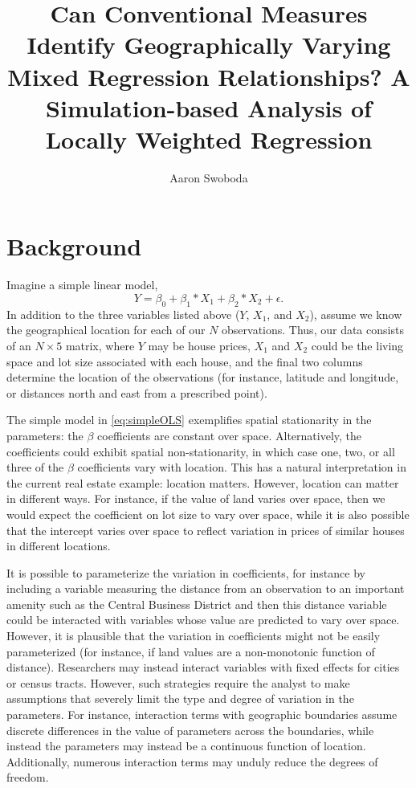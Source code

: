 \documentclass{article}\usepackage[]{graphicx}\usepackage[]{color}
\title{Can Conventional Measures Identify Geographically Varying Mixed Regression Relationships? A Simulation-based Analysis of Locally Weighted Regression}
\author{Aaron Swoboda}
\begin{document}
\maketitle







\section{Background}

Imagine a simple linear model,
\begin{equation}\label{eq:simpleOLS}
Y = \beta _0 + \beta _1 *X_1 + \beta _2 * X_2 + \epsilon .
\end{equation}
In addition to the three variables listed above ($Y$, $X_1$, and $X_2$), assume we know the geographical location for each of our $N$ observations. Thus, our data consists of an $N \times 5$ matrix, where $Y$ may be house prices, $X_1$ and $X_2$ could be the living space and lot size associated with each house, and the final two columns determine the location of the observations (for instance, latitude and longitude, or distances north and east from a prescribed point).

The simple model in \eqref{eq:simpleOLS} exemplifies spatial stationarity in the parameters: the $\beta$ coefficients are constant over space. Alternatively, the coefficients could exhibit spatial non-stationarity, in which case one, two, or all three of the $\beta$ coefficients vary with location. This has a natural interpretation in the current real estate example: location matters. However, location can matter in different ways. For instance, if the value of land varies over space, then we would expect the coefficient on lot size to vary over space, while it is also possible that the intercept varies over space to reflect variation in prices of similar houses in different locations. 

It is possible to parameterize the variation in coefficients, for instance by including a variable measuring the distance from an observation to an important amenity such as the Central Business District and then this distance variable could be interacted with variables whose value are predicted to vary over space. However, it is plausible that the variation in coefficients might not be easily parameterized (for instance, if land values are a non-monotonic function of distance). Researchers may instead interact variables with fixed effects for cities or census tracts. However, such strategies require the analyst to make assumptions that severely limit the type and degree of variation in the parameters. For instance, interaction terms with geographic boundaries assume discrete differences in the value of parameters across the boundaries, while instead the parameters may instead be a continuous function of location. Additionally, numerous interaction terms may unduly reduce the degrees of freedom.
\end{document}
